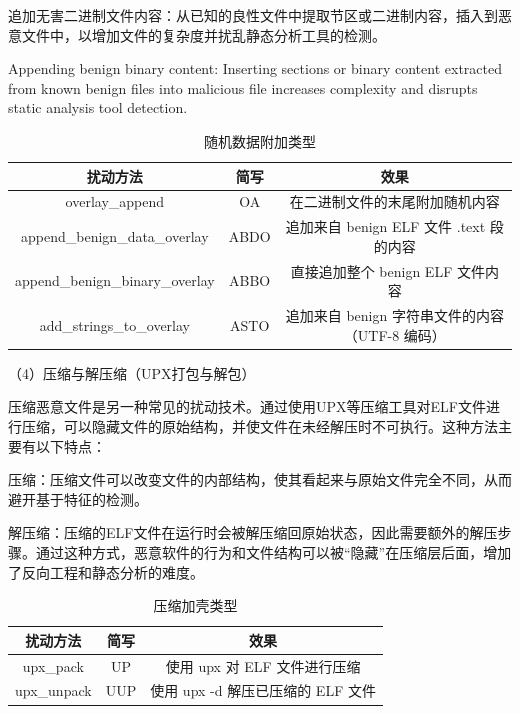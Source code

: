 追加无害二进制文件内容：从已知的良性文件中提取节区或二进制内容，插入到恶意文件中，以增加文件的复杂度并扰乱静态分析工具的检测。

Appending benign binary content: Inserting sections or binary content extracted from known benign files into malicious file increases complexity and disrupts static analysis tool detection.

\begin{table}[htbp]
	\centering
	\caption{随机数据附加类型}\label{tab:4.3}
	\begin{tabular*}{\textwidth}{@{\extracolsep{\fill}}ccc}
		\toprule
		扰动方法 & 简写 & 效果 \\
		\midrule
		overlay\_append & OA & 在二进制文件的末尾附加随机内容 \\
		append\_benign\_data\_overlay & ABDO & 追加来自 benign ELF 文件 .text 段的内容 \\
		append\_benign\_binary\_overlay & ABBO & 直接追加整个 benign ELF 文件内容 \\
		add\_strings\_to\_overlay & ASTO & 追加来自 benign 字符串文件的内容（UTF-8 编码） \\
		\bottomrule
	\end{tabular*}
\end{table}

（4）压缩与解压缩（UPX打包与解包）

压缩恶意文件是另一种常见的扰动技术。通过使用UPX等压缩工具对ELF文件进行压缩，可以隐藏文件的原始结构，并使文件在未经解压时不可执行。这种方法主要有以下特点：

压缩：压缩文件可以改变文件的内部结构，使其看起来与原始文件完全不同，从而避开基于特征的检测。

解压缩：压缩的ELF文件在运行时会被解压缩回原始状态，因此需要额外的解压步骤。通过这种方式，恶意软件的行为和文件结构可以被“隐藏”在压缩层后面，增加了反向工程和静态分析的难度。

\begin{table}[htbp]
	\centering
	\caption{压缩加壳类型}\label{tab:4.4}
	\begin{tabular*}{0.9\textwidth}{@{\extracolsep{\fill}}ccc}
		\toprule
		扰动方法 & 简写 & 效果 \\
		\midrule
		upx\_pack & UP & 使用 upx 对 ELF 文件进行压缩 \\
		upx\_unpack & UUP & 使用 upx -d 解压已压缩的 ELF 文件 \\
		\bottomrule
	\end{tabular*}
\end{table}

